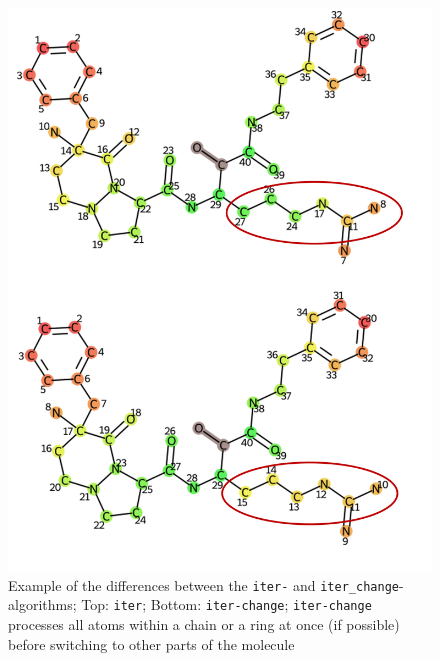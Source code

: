 \begin{figure}
\includegraphics[scale=0.25]{iter_iter_change_1a5g_1_two_rows}

\caption{Example of the differences between the \texttt{iter-} and \texttt{iter\_change}-algorithms;
Top: \texttt{iter}; Bottom: \texttt{iter-change}; \texttt{iter-change }processes all atoms within
a chain or a ring at once (if possible) before switching to other
parts of the molecule}
\label{fig:iter_iter_change_comparison}
\end{figure}

